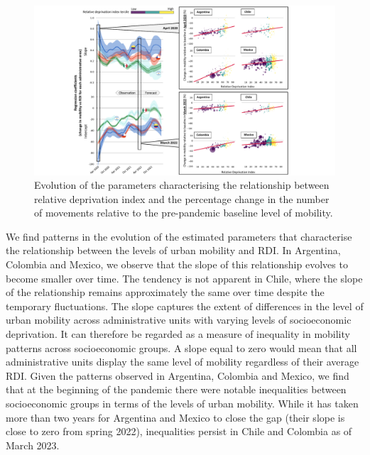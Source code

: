 \documentclass[
  11pt,
]{article}
\begin{document}
\begin{figure}[H]

{\centering \includegraphics{figures/regression-evo-nobackground.pdf}

}

\caption{Evolution of the parameters characterising the relationship
between relative deprivation index and the percentage change in the
number of movements relative to the pre-pandemic baseline level of
mobility.}

\end{figure}%

We find patterns in the evolution of the estimated parameters that
characterise the relationship between the levels of urban mobility and
RDI. In Argentina, Colombia and Mexico, we observe that the slope of
this relationship evolves to become smaller over time. The tendency is
not apparent in Chile, where the slope of the relationship remains
approximately the same over time despite the temporary fluctuations. The
slope captures the extent of differences in the level of urban mobility
across administrative units with varying levels of socioeconomic
deprivation. It can therefore be regarded as a measure of inequality in
mobility patterns across socioeconomic groups. A slope equal to zero
would mean that all administrative units display the same level of
mobility regardless of their average RDI. Given the patterns observed in
Argentina, Colombia and Mexico, we find that at the beginning of the
pandemic there were notable inequalities between socioeconomic groups in
terms of the levels of urban mobility. While it has taken more than two
years for Argentina and Mexico to close the gap (their slope is close to
zero from spring 2022), inequalities persist in Chile and Colombia as of
March 2023.
\end{document}
